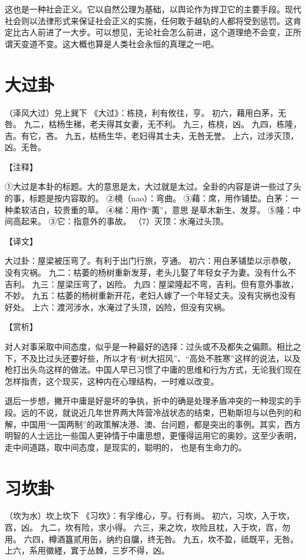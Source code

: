 \documentclass[12pt,UTF8]{ctexbook}
\begin{document}
这也是一种社会正义。它以自然公理为基础，以舆论作为捍卫它的主要手段。现代社会则以法律形式来保证社会正义的实施，任何敢于越轨的人都将受到惩罚。这肯定比古人前进了一大步。可以想见，无论社会怎么前进，这个道理绝不会变，正所谓天变道不变。这大概也算是人类社会永恒的真理之一吧。

\chapter{大过卦}

（泽风大过）兑上巽下
《大过》：栋挠，利有攸往，亨。
初六，藉用白茅，无咎。
九二，枯杨生稊，老夫得其女妻，无不利。
九三，栋桡，凶。
九四，栋隆，吉。有它，吝。
九五，枯杨生华，老妇得其士夫，无咎无誉。
上六，过涉灭顶，凶。无咎。

【注释】

①大过是本卦的标题。大的意思是太，大过就是太过。全卦的内容是讲一些过了头的事，标题是按内容取的。
②橈（nao）：弯曲。
③藉：席，用作铺垫。白茅：一种柔软洁白，较贵重的草。
④梯：用作“荑”，意思 是草木新生、发芽。
⑤隆：中间高起来。
③它：指意外的事故。
（7）灭顶：水淹过头顶。

【译文】

大过卦：屋梁被压弯了。有利于出门行旅，亨通。
初六：用白茅铺垫以示恭敬，没有灾祸。
九二：枯萎的杨树重新发芽，老头儿娶了年轻女子为妻。没有什么不吉利。
九三：屋梁压弯了，凶险。
九四：屋梁隆起不弯，吉利。但有意外事故，不妙。
九五：枯萎的杨树重新开花，老妇人嫁了一个年轻丈夫。没有灾祸也没有好处。
上六：渡河涉水，水淹过了头顶，凶险，但没有灾祸。

【赏析】

对人对事采取中间态度，似乎是一种最好的选择：过头或不及都失之偏颇。相比之下，不及比过头还要好些，所以才有“树大招风”、“高处不胜寒”这样的说法，以及枪打出头鸟这样的做法。中国人早已习惯了中庸的思维和行为方式，无论我们现在怎样指责，这个现买，这种内在心理结构，一时难以改变。

退后一步想，撇开中庸是好是坏的争执，折中的确是处理矛盾冲突的一种现实的手段。远的不说，就说近几年世界两大阵营冷战状态的结束，巴勒斯坦与以色列的和解，中国用“一国两制”的政策解决港、澳、台问题，都是突出的事例。其实，西方明智的人士远比一些国人更钟情于中庸思想，更懂得运用它的奥妙。这至少表明，走中间道路，取中间态度，是现实的，聪明的， 也是有生命力的。

\chapter{习坎卦}

（坎为水）坎上坎下
《习坎》：有孚维心，亨。行有尚。
初六，习坎，入于坎，窞，凶。
九二，坎有险，求小得。
六三，来之坎，坎险且枕，入于坎，窞，勿用。
六四，樽酒簋贰用缶，纳约自牖，终无咎。
九五，坎不盈，祗既平，无咎。
上六，系用徽纆，窴于丛棘，三岁不得，凶。
\end{document}
